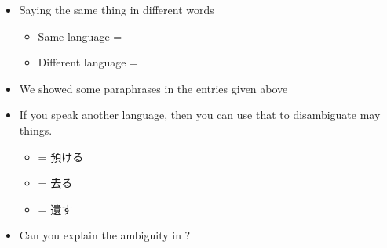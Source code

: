 \documentclass[a4paper,landscape,headrule,footrule,xetex]{foils}
\begin{document}
\begin{itemize}
\item Saying the same thing in different words
  \begin{itemize}
  \item Same language = 
  \item Different language = 
  \end{itemize}
\item We showed some paraphrases in the entries given above
\item If you speak another language, then you can use that to
  disambiguate may things.
  \begin{itemize}
  \item {} = 預ける 
  \item {} = 去る 
  \item {} = 遺す 
  \end{itemize}
\item Can you explain the ambiguity in ?\task
\end{itemize}


\end{document}
